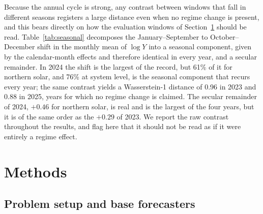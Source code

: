 \documentclass[preprint,3p,times]{elsarticle}
\providecommand{\DIFaddtex}[1]{{\protect\color{blue} \sf #1}} %
\providecommand{\DIFaddbegin}{} %
\providecommand{\DIFaddend}{} %
\providecommand{\DIFdelbegin}{} %
\providecommand{\DIFdelend}{} %
\providecommand{\DIFadd}[1]{\texorpdfstring{\DIFaddtex{#1}}{#1}} %
\begin{document}
\DIFaddbegin \DIFadd{Because the annual cycle is strong, any contrast between windows that fall in different seasons registers a large distance even when no regime change is present, and this bears directly on how the evaluation windows of Section~\ref{sec:methods} should be read. Table~\ref{tab:seasonal} decomposes the January--September to October--December shift in the monthly mean of $\log Y$ into a seasonal component, given by the calendar-month effects and therefore identical in every year, and a secular remainder. In 2024 the shift is the largest of the record, but 61\% of it for northern solar, and 76\% at system level, is the seasonal component that recurs every year; the same contrast yields a Wasserstein-1 distance of 0.96 in 2023 and 0.88 in 2025, years for which no regime change is claimed. The secular remainder of 2024, $+0.46$ for northern solar, is real and is the largest of the four years, but it is of the same order as the $+0.29$ of 2023. We report the raw contrast throughout the results, and flag here that it should not be read as if it were entirely a regime effect.
}



\DIFaddend %
\section{Methods}
\label{sec:methods}

\DIFdelbegin %
\DIFdelend \DIFaddbegin \subsection{Problem setup and base forecasters}
\label{sec:base}
\DIFaddend 
\end{document}
